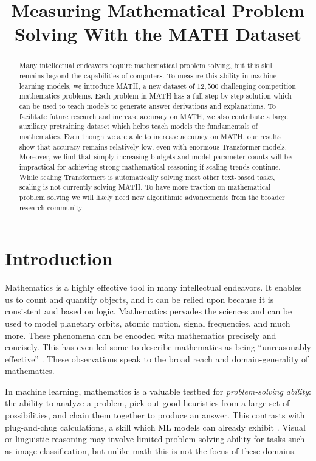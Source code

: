 \title{Measuring Mathematical Problem Solving With the MATH Dataset}

\begin{abstract}
Many intellectual endeavors require mathematical problem solving, but this skill remains beyond the capabilities of computers. To measure this ability in machine learning models, we introduce MATH, a new dataset of $12,\!500$ challenging competition mathematics problems. Each problem in MATH has a full step-by-step solution which can be used to teach models to generate answer derivations and explanations. To facilitate future research and increase accuracy on MATH, we also contribute a large auxiliary pretraining dataset which helps teach models the fundamentals of mathematics. Even though we are able to increase accuracy on MATH, our results show that accuracy remains relatively low, even with enormous Transformer models. Moreover, we find that simply increasing budgets and model parameter counts will be impractical for achieving strong mathematical reasoning if scaling trends continue. While scaling Transformers is automatically solving most other text-based tasks, scaling is not currently solving MATH. To have more traction on mathematical problem solving we will likely need new algorithmic advancements from the broader research community.
\end{abstract}

\section{Introduction}

Mathematics is a highly effective tool in many intellectual endeavors. It enables us to count and quantify objects, and it can be relied upon because it is consistent and based on logic. Mathematics pervades the sciences and can be used to model planetary orbits, atomic motion, signal frequencies, and much more. These phenomena can be encoded with mathematics precisely and concisely. This has even led some to describe mathematics as being ``unreasonably effective'' \citep{Wigner1960TheUE}. These observations speak to the broad reach and domain-generality of mathematics.

In machine learning, mathematics is a valuable testbed for \emph{problem-solving ability}: the ability to analyze a problem, pick out good heuristics from a large set of possibilities, and chain them together to produce an answer. This contrasts with plug-and-chug calculations, a skill which ML models can already exhibit \citep{Henighan2020ScalingLF}. Visual or linguistic reasoning may involve limited problem-solving ability for tasks such as image classification, but unlike math this is not the focus of these domains.

